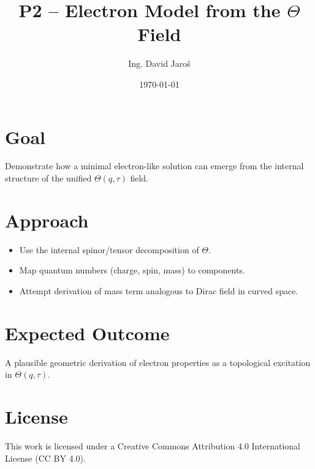 \documentclass[12pt]{article}
\title{P2 – Electron Model from the $\Theta$ Field}
\author{Ing. David Jaroš}
\date{\today}
\begin{document}
\maketitle

\section*{Goal}
Demonstrate how a minimal electron-like solution can emerge from the internal structure of the unified $\Theta(q,\tau)$ field.

\section*{Approach}
\begin{itemize}
\item Use the internal spinor/tensor decomposition of $\Theta$.
\item Map quantum numbers (charge, spin, mass) to components.
\item Attempt derivation of mass term analogous to Dirac field in curved space.
\end{itemize}

\section*{Expected Outcome}
A plausible geometric derivation of electron properties as a topological excitation in $\Theta(q, \tau)$.


\section*{License}
This work is licensed under a Creative Commons Attribution 4.0 International License (CC BY 4.0).
\end{document}
